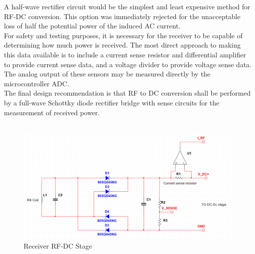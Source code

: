 \documentclass[12pt]{article}
\begin{document}
\indent
A half-wave rectifier circuit would be the simplest and least expensive method for RF-DC conversion. This option was immediately rejected for the unacceptable loss of half the potential power of the induced AC current.\\

\indent
For safety and testing purposes, it is necessary for the receiver to be capable of determining how much power is received. The most direct approach to making this data available is to include a current sense resistor and differential amplifier to provide current sense data, and a voltage divider to provide voltage sense data. The analog output of these sensors may be measured directly by the microcontroller ADC.\\

\indent
The final design recommendation is that RF to DC conversion shall be performed by a full-wave Schottky diode rectifier bridge with sense circuits for the measurement of received power.\\

\hfill \\
\begin{figure}[h!]
\centering
\includegraphics[width=0.9\linewidth]{sim_rfdc}
\caption{Receiver RF-DC Stage}
\end{figure}\\
\hfill \\
\end{document}
